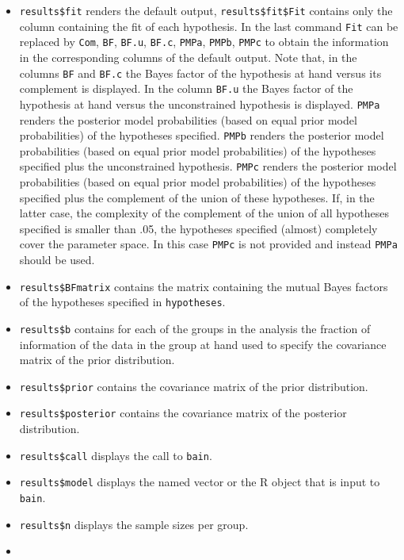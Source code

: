 \documentclass[
]{book}
\providecommand{\tightlist}{%
  \setlength{\itemsep}{0pt}\setlength{\parskip}{0pt}}
\begin{document}
\begin{itemize}
\tightlist
\item
  \texttt{results\$fit} renders the default output, \texttt{results\$fit\$Fit}
  contains only the column containing the fit of each hypothesis. In the last
  command \texttt{Fit} can be replaced by \texttt{Com}, \texttt{BF}, \texttt{BF.u}, \texttt{BF.c}, \texttt{PMPa},
  \texttt{PMPb}, \texttt{PMPc} to obtain the information in the corresponding columns of the
  default output. Note that, in the columns \texttt{BF} and \texttt{BF.c} the Bayes factor of the
  hypothesis at hand versus its complement is displayed. In the column \texttt{BF.u} the
  Bayes factor of the hypothesis at hand versus the unconstrained hypothesis is
  displayed. \texttt{PMPa} renders the posterior model probabilities (based on equal
  prior model probabilities) of the hypotheses specified. \texttt{PMPb} renders
  the posterior model probabilities (based on equal
  prior model probabilities) of the hypotheses specified plus the unconstrained
  hypothesis. \texttt{PMPc} renders the posterior model probabilities (based on equal
  prior model probabilities) of the hypotheses specified plus the complement of
  the union of these hypotheses. If, in the latter case, the complexity of the
  complement of the union of all hypotheses specified is smaller than .05, the
  hypotheses specified (almost) completely cover the parameter space. In this
  case \texttt{PMPc} is not provided and instead \texttt{PMPa} should be used.
\item
  \texttt{results\$BFmatrix} contains the matrix containing the mutual Bayes
  factors of the hypotheses specified in \texttt{hypotheses}.
\item
  \texttt{results\$b} contains for each of the groups in the analysis the
  fraction of information of the data in the group at hand used to specify the
  covariance matrix of the prior distribution.
\item
  \texttt{results\$prior} contains the covariance matrix of the prior
  distribution.
\item
  \texttt{results\$posterior} contains the covariance matrix of the
  posterior distribution.
\item
  \texttt{results\$call} displays the call to \texttt{bain}.
\item
  \texttt{results\$model} displays the named vector or the R object that is input to \texttt{bain}.
\item
  \texttt{results\$n} displays the sample sizes per group.
\item

\end{itemize}
\end{document}
